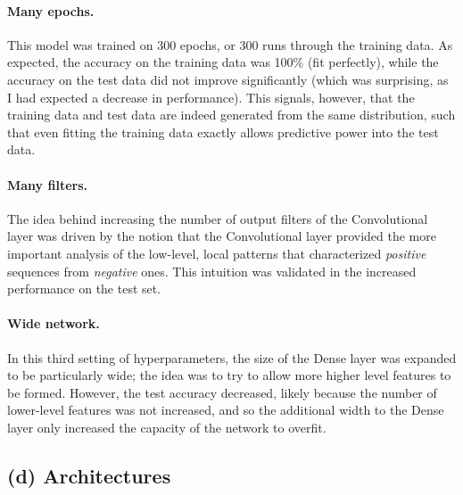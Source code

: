 \documentclass{article}[11pt]
\begin{document}
\paragraph{Many epochs.} This model was trained on 300 epochs, or
300 runs through the training data. As expected, the accuracy
on the training data was 100\% (fit perfectly), while the
accuracy on the test data did not improve significantly (which
was surprising, as I had expected a decrease in performance).
This signals, however, that the training data and test data
are indeed generated from the same distribution, such that
even fitting the training data exactly allows predictive
power into the test data.

\paragraph{Many filters.} The idea behind increasing the 
number of output filters of the Convolutional layer was
driven by the notion that the Convolutional layer provided
the more important analysis of the low-level, local patterns
that characterized {\it positive} sequences from {\it negative} ones.
This intuition was validated in the increased performance on the
test set.

\paragraph{Wide network.} In this third setting of hyperparameters,
the size of the Dense layer was expanded to be particularly wide;
the idea was to try to allow more higher level features to be
formed. However, the test accuracy decreased, likely because the number
of lower-level features was not increased, and so the
additional width to the Dense layer only increased
the capacity of the network to overfit.

\subsection*{(d) Architectures}
\end{document}
